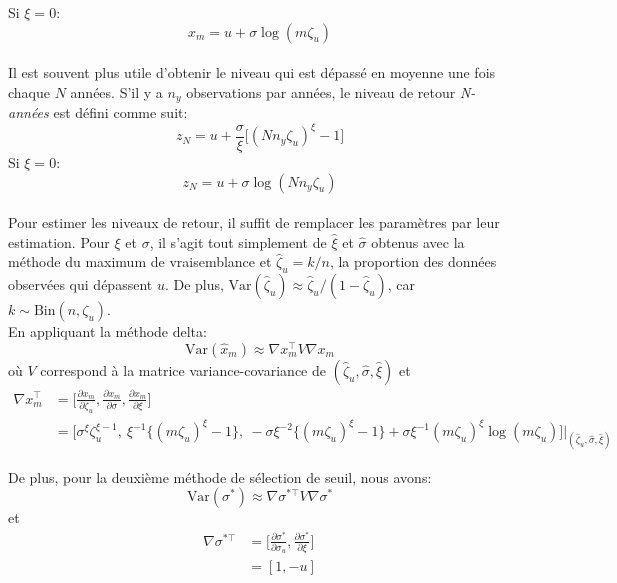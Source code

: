 Si $\xi =0$:
\begin{equation}\label{eq:1.2.10}
x_m = u + \sigma\log(m\zeta_u)
\end{equation}
\\

Il est souvent plus utile d'obtenir le niveau  qui est dépassé en moyenne une fois chaque $N$ années. S'il y a $n_y$ observations par années, le niveau de retour \textit{N-années} est défini comme suit:
\begin{equation}\label{eq:1.2.11}
z_N = u + \frac{\sigma}{\xi} \Big[(Nn_y \zeta_u)^\xi -1\Big]
\end{equation}
Si $\xi =0$:
\begin{equation}\label{eq:1.2.12}
z_N = u + \sigma\log(Nn_y\zeta_u)
\end{equation} 
\\

Pour estimer les niveaux de retour, il suffit de remplacer les paramètres par leur estimation. Pour $\xi$ et $\sigma$, il s'agit tout simplement de $\hat\xi$ et $\hat\sigma$ obtenus avec la méthode du maximum de vraisemblance et $\hat\zeta_u = k/n$, la proportion des données observées qui dépassent $u$. De plus, $\text{Var}(\hat\zeta_u) \approx \hat\zeta_u/(1- \hat\zeta_u)$, car $k \sim \text{Bin}(n,\zeta_u)$. \\

En appliquant la méthode delta:
\begin{equation}\label{eq:1.2.13}
\text{Var}(\hat{x}_m) \approx \nabla x^{\top}_m V \nabla x_m
\end{equation}
où $V$ correspond à la matrice variance-covariance de $(\hat\zeta_u,\hat\sigma, \hat\xi)$ et
\begin{equation}\label{eq:1.2.14}
\begin{split}
\nabla x^{\top}_m &= \Big[ \frac{\partial x_m}{\partial \zeta_u}, \frac{\partial x_m}{\partial \sigma}, \frac{\partial x_m}{\partial \xi}\Big] \\
&= \Big[\sigma^\xi \zeta^{\xi -1}_u,\ \xi^{-1} \{(m\zeta_u)^{\xi} -1\},\ -\sigma\xi^{-2}\{(m\zeta_u)^{\xi} -1\} + \sigma\xi^{-1}(m\zeta_u)^{\xi}\log(m\zeta_u)\Big]\Bigg|_{(\hat\zeta_u, \hat\sigma, \hat\xi)}
\end{split}
\end{equation}

De plus, pour la deuxième méthode de sélection de seuil, nous avons:
\begin{equation}\label{eq:1.2.15}
\text{Var}(\sigma^*) \approx \nabla \sigma^{*\top} V \nabla \sigma^*
\end{equation}
et 
\begin{equation}\label{eq:1.2.16}
\begin{split}
\nabla \sigma^{*\top} &= \Bigg[ \frac{\partial \sigma^*}{\partial \sigma_u}, \frac{\partial \sigma^*}{\partial \xi}\Bigg] \\
    &= [1, -u]
\end{split}
\end{equation}

